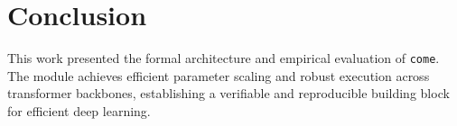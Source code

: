 \section{Conclusion}
This work presented the formal architecture and empirical evaluation of \texttt{come}. The module achieves efficient parameter scaling and robust execution across transformer backbones, establishing a verifiable and reproducible building block for efficient deep learning.
